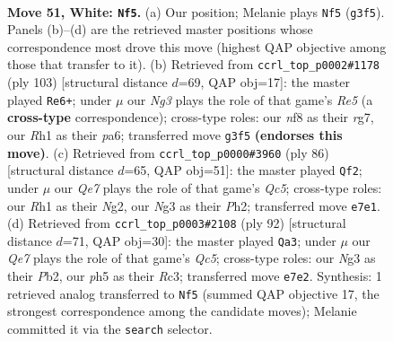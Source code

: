 \documentclass[11pt]{article}
\begin{document}
\clearpage

\begin{figure}[p]\centering
\begin{subfigure}{0.46\textwidth}\centering
\resizebox{\linewidth}{!}{%
\newchessgame
\chessboard[
  setfen={2r2nk1/1p2Q2p/8/3q3p/8/6N1/5R1K/7R w - - 14 51},
  showmover=false,
  pgfstyle=straightmove, color=movearrow, markmove={g3-f5}
]}
\caption{}
\end{subfigure}\hfill
\begin{subfigure}{0.46\textwidth}\centering
\resizebox{\linewidth}{!}{%
\newchessgame
\chessboard[
  setfen={4kq2/6R1/Pp4K1/3p4/4rP2/2P3Q1/8/2B5 b - - 0 52},
  showmover=false,
  pgfstyle=straightmove, color=movearrow, markmove={e4-e6}
]}
\caption{}
\end{subfigure}
\\[4pt]
\begin{subfigure}{0.46\textwidth}\centering
\resizebox{\linewidth}{!}{%
\newchessgame
\chessboard[
  setfen={8/4p3/6kp/2Qb4/1n2q1p1/8/6NP/5RK1 w - - 5 44},
  showmover=false,
  pgfstyle=straightmove, color=movearrow, markmove={c5-f2}
]}
\caption{}
\end{subfigure}\hfill
\begin{subfigure}{0.46\textwidth}\centering
\resizebox{\linewidth}{!}{%
\newchessgame
\chessboard[
  setfen={1kr5/p7/1n2q2P/2Q1p3/4B3/2R5/1P6/1K6 w - - 3 47},
  showmover=false,
  pgfstyle=straightmove, color=movearrow, markmove={c5-a3}
]}
\caption{}
\end{subfigure}
\caption{\textbf{Move 51, White: \texttt{Nf5}.} (a) Our position; Melanie plays \texttt{Nf5} (\texttt{g3f5}). Panels (b)--(d) are the retrieved master positions whose correspondence most drove this move (highest QAP objective among those that transfer to it). (b) Retrieved from \texttt{ccrl\_top\_p0002\#1178} (ply 103) [structural distance $d$=69, QAP obj=17]: the master played \texttt{Re6+}; under $\mu$ our \emph{Ng3} plays the role of that game's \emph{Re5} (a \textbf{cross-type} correspondence); cross-type roles: our \emph{n}f8 as their \emph{r}g7, our \emph{R}h1 as their \emph{p}a6; transferred move \texttt{g3f5} \textbf{(endorses this move)}. (c) Retrieved from \texttt{ccrl\_top\_p0000\#3960} (ply 86) [structural distance $d$=65, QAP obj=51]: the master played \texttt{Qf2}; under $\mu$ our \emph{Qe7} plays the role of that game's \emph{Qc5}; cross-type roles: our \emph{R}h1 as their \emph{N}g2, our \emph{N}g3 as their \emph{P}h2; transferred move \texttt{e7e1}. (d) Retrieved from \texttt{ccrl\_top\_p0003\#2108} (ply 92) [structural distance $d$=71, QAP obj=30]: the master played \texttt{Qa3}; under $\mu$ our \emph{Qe7} plays the role of that game's \emph{Qc5}; cross-type roles: our \emph{N}g3 as their \emph{P}b2, our \emph{p}h5 as their \emph{R}c3; transferred move \texttt{e7e2}. Synthesis: 1 retrieved analog transferred to \texttt{Nf5} (summed QAP objective 17, the strongest correspondence among the candidate moves); Melanie committed it via the \texttt{search} selector.}
\label{fig:thought-m100}
\end{figure}
\end{document}
